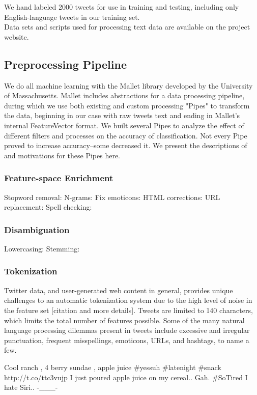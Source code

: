 \documentclass[letterpaper]{article}
\begin{document}
We hand labeled 2000 tweets for use in training and testing, including only English-language tweets in our training set. \\
Data sets and scripts used for processing text data are available on the project website.\\

\subsection{Preprocessing Pipeline}

We do all machine learning with the Mallet\cite{McCallumMALLET} library developed by the University of Massachusetts. Mallet includes abstractions for a data processing pipeline, during which we use both existing and custom processing "Pipes" to transform the data, beginning in our case with raw tweets text and ending in Mallet's internal FeatureVector format. We built several Pipes to analyze the effect of different filters and processes on the accuracy of classification. Not every Pipe proved to increase accuracy--some decreased it. We present the descriptions of and motivations for these Pipes here.

\subsubsection{Feature-space Enrichment}
Stopword removal: 
N-grams: 
Fix emoticons: 
HTML corrections: 
URL replacement: 
Spell checking: 

\subsubsection{Disambiguation}
Lowercasing:
Stemming:

\subsubsection{Tokenization}
Twitter data, and user-generated web content in general, provides unique challenges to an automatic tokenization system due to the high level of noise in the feature set [citation and more details]. Tweets are limited to 140 characters, which limits the total number of features possible. Some of the many natural language processing dilemmas present in tweets include excessive and irregular punctuation, frequent misspellings, emoticons, URLs, and hashtags, to name a few.

Cool ranch , 4 berry sundae , apple juice \#yessuh \#latenight \#snack http://t.co/ttc3vujp 
I just poured apple juice on my cereal.. Gah. \#SoTired 
I hate Siri.. -\_\_\_- 
\end{document}
